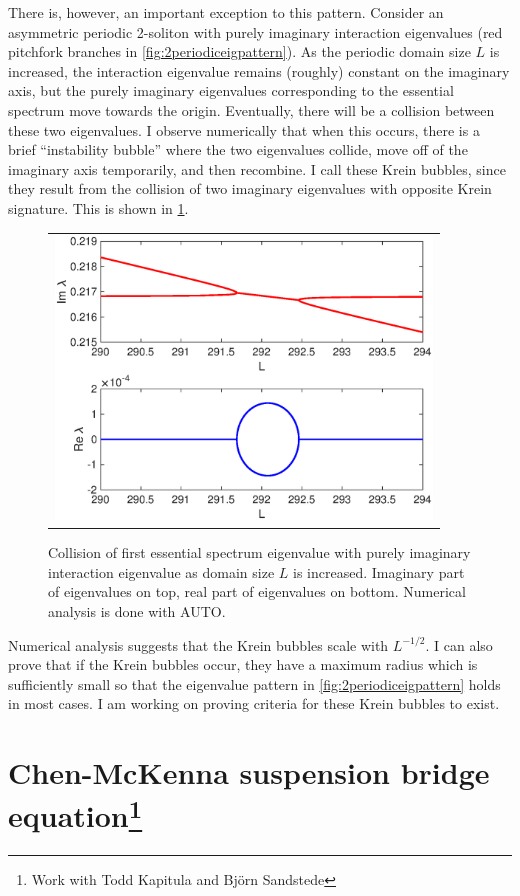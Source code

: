\documentclass[12pt,reqno]{amsart}
\theoremstyle{definition}
\theoremstyle{remark}
\begin{document}
There is, however, an important exception to this pattern. Consider an asymmetric periodic 2-soliton with purely imaginary interaction eigenvalues (red pitchfork branches in \cref{fig:2periodiceigpattern}). As the periodic domain size $L$ is increased, the interaction eigenvalue remains (roughly) constant on the imaginary axis, but the purely imaginary eigenvalues corresponding to the essential spectrum move towards the origin. Eventually, there will be a collision between these two eigenvalues. I observe numerically that when this occurs, there is a brief ``instability bubble'' where the two eigenvalues collide, move off of the imaginary axis temporarily, and then recombine. I call these Krein bubbles, since they result from the collision of two imaginary eigenvalues with opposite Krein signature. This is shown in \cref{fig:kreinbubble1}.

\begin{figure}[ht]
\centering
\begin{tabular}{c}
\includegraphics[width=10cm]{kreinbubble1}
\end{tabular}
\caption{Collision of first essential spectrum eigenvalue with purely imaginary interaction eigenvalue as domain size $L$ is increased. Imaginary part of eigenvalues on top, real part of eigenvalues on bottom. Numerical analysis is done with AUTO.}
\label{fig:kreinbubble1}
\end{figure}

Numerical analysis suggests that the Krein bubbles scale with $L^{-1/2}$. I can also prove that if the Krein bubbles occur, they have a maximum radius which is sufficiently small so that the eigenvalue pattern in \cref{fig:2periodiceigpattern} holds in most cases. I am working on proving criteria for these Krein bubbles to exist.

\section{Chen-McKenna suspension bridge equation\footnote{Work with Todd Kapitula and Bj\"{o}rn Sandstede}}
\end{document}
